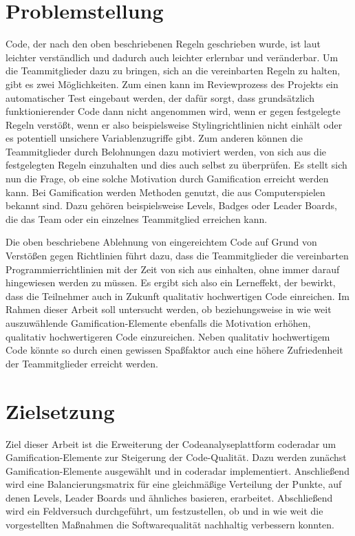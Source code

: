 \documentclass[fontsize=11pt, paper=a4, parskip=half]{scrartcl}
\begin{document}
\section{Problemstellung}
Code, der nach den oben beschriebenen Regeln geschrieben wurde, ist laut \cite{PJ2015} leichter verständlich und dadurch auch leichter erlernbar und veränderbar.
Um die Teammitglieder dazu zu bringen, sich an die vereinbarten Regeln zu halten, gibt es zwei Möglichkeiten.
Zum einen kann im Reviewprozess des Projekts ein automatischer Test eingebaut werden, der dafür sorgt, dass grundsätzlich funktionierender Code dann nicht angenommen wird, wenn er gegen festgelegte Regeln verstößt, wenn er also beispielsweise Stylingrichtlinien nicht einhält oder es potentiell unsichere Variablenzugriffe gibt.
Zum anderen können die Teammitglieder durch Belohnungen dazu motiviert werden, von sich aus die festgelegten Regeln einzuhalten und dies auch selbst zu überprüfen. 
Es stellt sich nun die Frage, ob eine solche Motivation durch Gamification erreicht werden kann.
Bei Gamification werden Methoden genutzt, die aus Computerspielen bekannt sind.
Dazu gehören beispielsweise Levels, Badges oder Leader Boards, die das Team oder ein einzelnes Teammitglied erreichen kann. 

Die oben beschriebene Ablehnung von eingereichtem Code auf Grund von Verstößen gegen Richtlinien führt dazu, dass die Teammitglieder die vereinbarten Programmierrichtlinien mit der Zeit von sich aus einhalten, ohne immer darauf hingewiesen werden zu müssen.
Es ergibt sich also ein Lerneffekt, der bewirkt, dass die Teilnehmer auch in Zukunft qualitativ hochwertigen Code einreichen.
Im Rahmen dieser Arbeit soll untersucht werden, ob beziehungsweise in wie weit auszuwählende Gamification-Elemente ebenfalls die Motivation erhöhen, qualitativ hochwertigeren Code einzureichen.
Neben qualitativ hochwertigem Code könnte so durch einen gewissen \glqq Spaßfaktor\grqq{} auch eine höhere Zufriedenheit der Teammitglieder erreicht werden.

\section{Zielsetzung}
Ziel dieser Arbeit ist die Erweiterung der Codeanalyseplattform coderadar um Gamification-Elemente zur Steigerung der Code-Qualität.
Dazu werden zunächst Gamification-Elemente ausgewählt und in coderadar implementiert.
Anschließend wird eine Balancierungsmatrix für eine gleichmäßige Verteilung der Punkte, auf denen Levels, Leader Boards und ähnliches basieren, erarbeitet.
Abschließend wird ein Feldversuch durchgeführt, um festzustellen, ob und in wie weit die vorgestellten Maßnahmen die Softwarequalität nachhaltig verbessern konnten.
\end{document}

